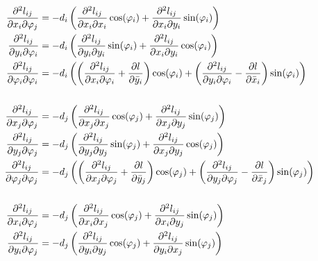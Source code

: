 \begin{align}
\frac{\partial^2 l_{ij}}{\partial x_{i} \partial \varphi_{j}} &= -d_{i}\left( \frac{\partial^2 l_{ij}}{\partial x_{i} \partial x_{i}}\cos(\varphi_{i}) + \frac{\partial^2 l_{ij}}{\partial x_{i} \partial y_{i}}\sin(\varphi_{i})\right) \\
\frac{\partial^2 l_{ij}}{\partial y_{i} \partial \varphi_{i}} &= -d_{i}\left( \frac{\partial^2 l_{ij}}{\partial y_{i} \partial y_{i}}\sin(\varphi_{i}) + \frac{\partial^2 l_{ij}}{\partial x_{i} \partial y_{i}}\cos(\varphi_{i})\right) \\
\frac{\partial^2 l_{ij}}{\partial \varphi_{i} \partial \varphi_{i}} &= -d_{i}\left(\left(\frac{\partial^2 l_{ij}}{\partial x_{i} \partial \varphi_{i}} + \frac{\partial l}{\partial \bar{y}_{i}}\right)\cos(\varphi_{i}) + \left(\frac{\partial^2 l_{ij}}{\partial y_{i} \partial \varphi_{i}} - \frac{\partial l}{\partial \bar{x}_{i}}\right)\sin(\varphi_{i})\right) \\
\notag \\
\frac{\partial^2 l_{ij}}{\partial x_{j} \partial \varphi_{j}} &= -d_{j}\left( \frac{\partial^2 l_{ij}}{\partial x_{j} \partial x_{j}}\cos(\varphi_{j}) + \frac{\partial^2 l_{ij}}{\partial x_{j} \partial y_{j}}\sin(\varphi_{j})\right) \\
\frac{\partial^2 l_{ij}}{\partial y_{j} \partial \varphi_{j}} &= -d_{j}\left( \frac{\partial^2 l_{ij}}{\partial y_{j} \partial y_{j}}\sin(\varphi_{j}) + \frac{\partial^2 l_{ij}}{\partial x_{j} \partial y_{j}}\cos(\varphi_{j})\right) \\
\frac{\partial^2 l_{ij}}{\partial \varphi_{j} \partial \varphi_{j}} &= -d_{j}\left(\left(\frac{\partial^2 l_{ij}}{\partial x_{j} \partial \varphi_{j}} + \frac{\partial l}{\partial \bar{y}_{j}}\right)\cos(\varphi_{j}) + \left(\frac{\partial^2 l_{ij}}{\partial y_{j} \partial \varphi_{j}} - \frac{\partial l}{\partial \bar{x}_{j}}\right)\sin(\varphi_{j})\right) \\
\notag \\
\frac{\partial^2 l_{ij}}{\partial x_{i} \partial \varphi_{j}} &= -d_{j}\left( \frac{\partial^2 l_{ij}}{\partial x_{i} \partial x_{j}}\cos(\varphi_{j}) + \frac{\partial^2 l_{ij}}{\partial x_{i} \partial y_{j}}\sin(\varphi_{j})\right) \\
\frac{\partial^2 l_{ij}}{\partial y_{i} \partial \varphi_{j}} &= -d_{j}\left( \frac{\partial^2 l_{ij}}{\partial y_{i} \partial y_{j}}\cos(\varphi_{j}) + \frac{\partial^2 l_{ij}}{\partial y_{i} \partial x_{j}}\sin(\varphi_{j}) \right) \\

\end{align}
